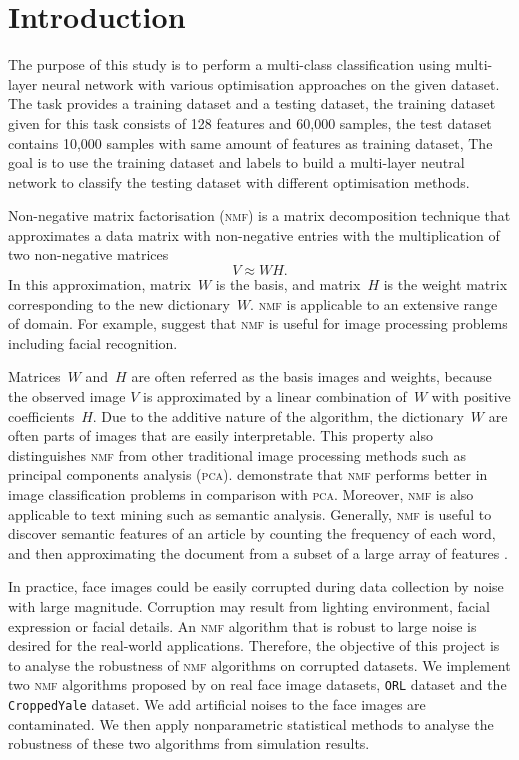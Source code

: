 \section{Introduction\label{chapter1}}
The purpose of this study is to perform a multi-class classification using multi-layer neural network with various optimisation approaches on the given dataset.
The task provides a training dataset and a testing dataset,
the training dataset given for this task consists of 128 features and 60,000 samples,
the test dataset contains 10,000 samples with same amount of features as training dataset,
The goal is to use the training dataset and labels to build a multi-layer neutral network to classify the testing dataset with different optimisation methods.

Non-negative matrix factorisation (\textsc{nmf}) is a matrix decomposition technique that approximates a data matrix with non-negative entries with the multiplication of two non-negative matrices
\begin{equation*}
  V \approx WH.
\end{equation*}
In this approximation, matrix~$W$ is the basis, and matrix~$H$ is the weight matrix corresponding to the new dictionary~$W$. \textsc{nmf}
is applicable to an extensive range of domain. For example, \citet{lee1999learning} suggest that \textsc{nmf} is useful for image processing problems including facial recognition.

Matrices~$W$ and~$H$ are often referred as the basis images and weights, 
because the observed image $V$ is approximated by a linear combination of~$W$ with positive coefficients~$H$.
Due to the additive nature of the algorithm, the dictionary~$W$ are often parts of images that are easily interpretable.
This property also distinguishes \textsc{nmf} from other traditional image processing methods such as principal components analysis (\textsc{pca}).
\citet{guillamet2002non} demonstrate that \textsc{nmf} performs better in image classification problems in comparison with \textsc{pca}.
Moreover, \textsc{nmf} is also applicable to text mining such as semantic analysis.
Generally, \textsc{nmf} is useful to discover semantic features of an article by counting the frequency of each word, and then approximating the document from a subset of a large array of features \citep{lee1999learning}.

In practice, face images could be easily corrupted during data collection by noise with large magnitude. Corruption may result from lighting environment, facial expression or facial details. An \textsc{nmf} algorithm that is robust to large noise is desired for the real-world applications. Therefore, the objective of this project is to analyse the robustness of \textsc{nmf} algorithms on corrupted datasets. We implement two \textsc{nmf} algorithms proposed by \citet{lee2001algorithms} on real face image datasets, \texttt{ORL} dataset and the \texttt{CroppedYale} dataset. We add artificial noises to the face images are contaminated. We then apply nonparametric statistical methods to analyse the robustness of these two algorithms from simulation results.

